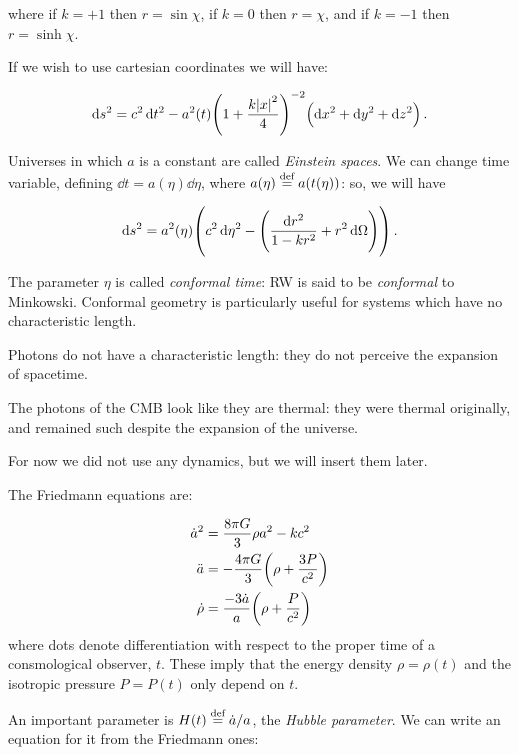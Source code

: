 \documentclass[main.tex]{subfiles}
\begin{document}
where if \(k = +1\)  then \(r = \sin \chi\), if \(k=0\)  then \(r=\chi\), and if \(k = -1\) then \(r = \sinh \chi\).

If we wish to use cartesian coordinates we will have:

\begin{equation}
  \dd{s^2} = c^2 \dd{t^2} - a^2 (t) \qty(1 + \frac{k \abs{x}^2}{4} )^{-2} \qty(\dd{x^2} + \dd{y^2} + \dd{z^2}) \,.
\end{equation}

Universes in which \(a\) is a constant are called \emph{Einstein spaces}.
We can change time variable, defining \(\dd{t} = a(\eta) \dd{\eta} \), where \(a(\eta) \stackrel{\text{def}}{=} a(t(\eta))\):  so, we will have

\begin{equation}
  \dd{s^2} = a^2 (\eta) \qty(c^2 \dd{\eta^2} - \qty(\frac{\dd{r^2}}{1 - kr^2} + r^2 \dd{\Omega})) \,.
\end{equation}

The parameter \(\eta\) is called \emph{conformal time}: RW is said to be \emph{conformal} to Minkowski.
Conformal geometry is particularly useful for systems which have no characteristic length.

Photons do not have a characteristic length: they do not perceive the expansion of spacetime.

The photons of the CMB look like they are thermal: they were thermal originally, and remained such despite the expansion of the universe.

For now we did not use any dynamics, but we will insert them later.

The Friedmann equations are:

\begin{subequations}
\begin{align}
    \dot{a}^2 &= \frac{8 \pi G }{3} \rho a^2 - kc^2  \\
    \ddot{a} &= - \frac{4 \pi G }{3}  \qty(\rho  + \frac{3P}{c^2} )  \\
    \dot{\rho} &= \frac{-3 \dot{a} }{a} \qty(\rho + \frac{P}{c^2} )
\end{align}
\end{subequations}
%
where dots denote differentiation with respect to the proper time of a consmological observer, \(t\).
These imply that the energy density \(\rho = \rho( t)\) and the isotropic pressure \(P = P(t)\) only depend on \(t\).

An important parameter is \(H(t) \stackrel{\text{def}}{=} \dot{a} / a\), the \emph{Hubble parameter}.
We can write an equation for
 it from the Friedmann ones:
\end{document}
